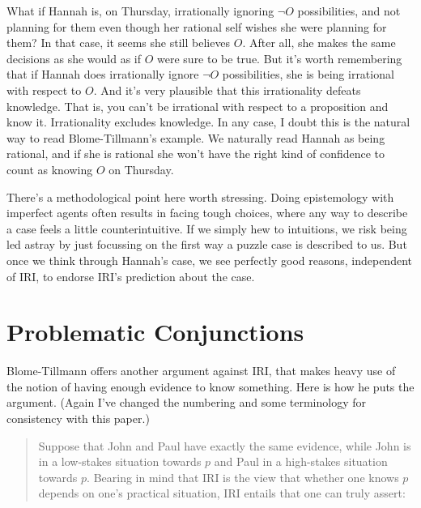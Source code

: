 What if Hannah is, on Thursday, irrationally ignoring $\neg O$ possibilities, and not planning for them even though her rational self wishes she were planning for them? In that case, it seems she still believes $O$. After all, she makes the same decisions as she would as if $O$ were sure to be true. But it's worth remembering that if Hannah does irrationally ignore $\neg O$ possibilities, she is being irrational with respect to $O$. And it's very plausible that this irrationality defeats knowledge. That is, you can't be irrational with respect to a proposition and know it. Irrationality excludes knowledge. In any case, I doubt this is the natural way to read Blome-Tillmann's example. We naturally read Hannah as being rational, and if she is rational she won't have the right kind of confidence to count as knowing $O$ on Thursday.

There's a methodological point here worth stressing. Doing epistemology with imperfect agents often results in facing tough choices, where any way to describe a case feels a little counterintuitive. If we simply hew to intuitions, we risk being led astray by just focussing on the first way a puzzle case is described to us. But once we think through Hannah's case, we see perfectly good reasons, independent of IRI, to endorse IRI's prediction about the case.

\section{Problematic Conjunctions} \label{sect:conj}
Blome-Tillmann offers another argument against IRI, that makes heavy use of the notion of having enough evidence to know something. Here is how he puts the argument. (Again I've changed the numbering and some terminology for consistency with this paper.)

\begin{quote}
\noindent Suppose that John and Paul have exactly the same evidence, while John is in a low-stakes situation towards $p$ and Paul in a high-stakes situation towards $p$. Bearing in mind that IRI is the view that whether one knows $p$ depends on one's practical situation, IRI entails that one can truly assert:

 \cite[328-9]{MBT2009}
\end{quote}


